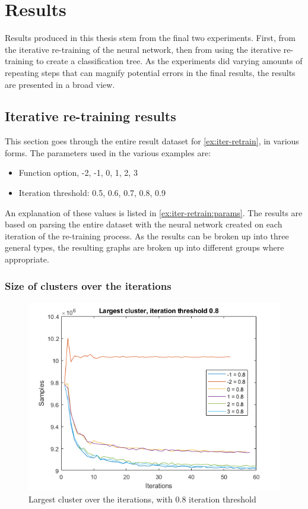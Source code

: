 \chapter{Results}


Results produced in this thesis stem from the final two experiments.
First, from the iterative re-training of the neural network, then from using the iterative re-training to create a classification tree.
As the experiments did varying amounts of repeating steps that can magnify potential errors in the final results, the results are presented in a broad view. 

\section{Iterative re-training results}
\label{res:iter}
This section goes through the entire result dataset for \cref{ex:iter-retrain}, in various forms.
The parameters used in the various examples are:

\begin{itemize}
    \item Function option, -2, -1, 0, 1, 2, 3
    \item Iteration threshold: 0.5, 0.6, 0.7, 0.8, 0.9
\end{itemize}{}
An explanation of these values is listed in \cref{ex:iter-retrain:params}.
The results are based on parsing the entire dataset with the neural network created on each iteration of the re-training process.
As the results can be broken up into three general types, the resulting graphs are broken up into different groups where appropriate.

\subsection{Size of clusters over the iterations}

\begin{figure}  %
  \centering
  \includegraphics[width=.7\textwidth]{figures/largest-0.8.png}
  \caption{Largest cluster over the iterations, with 0.8 iteration threshold}
  \label{fig:iter:largestcluster0.8}
\end{figure}


